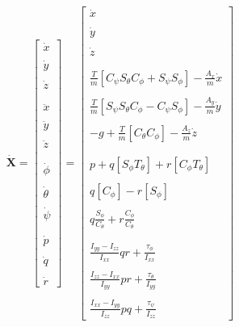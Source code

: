 \documentclass[letterpaper, 10 pt, conference]{ieeeconf}  %
\begin{document}
 $$
 \dot{\boldsymbol{X}} =
 \left[
 \begin{array}{c}
 \dot{x} \\
 {}\\
 \dot{y} \\
 {}\\
 \dot{z} \\
 {}\\
 {}\\
 \ddot{x} \\
 {}\\
 \ddot{y} \\
 {}\\
 \ddot{z} \\
 {}\\
 {}\\
 \dot{\phi} \\
 {}\\
 \dot{\theta} \\
 {}\\
 \dot{\psi} \\
 {}\\
 {}\\
 \dot{p} \\
 {}\\
 \dot{q} \\
 {}\\
 \dot{r}
 \end{array}
 \right]
 =
 \left[
 \begin{array}{l}
 \dot{x} \\
 {}\\
 \dot{y} \\
 {}\\
 \dot{z} \\
 {}\\
 {}\\
 \frac{T}{m}[C_{\psi} S_{\theta} C_{\phi} + S_{\psi} S_{\phi}] - \frac{A_x}{m} \dot{x} \\
 {}\\
 \frac{T}{m}[ S_{\psi} S_{\theta} C_{\phi} - C_{\psi} S_{\phi}] - \frac{A_y}{m} \dot{y} \\
 {}\\
 -g+\frac{T}{m}[C_{\theta} C_{\phi}] - \frac{A_z}{m} \dot{z} \\
 {}\\
 {}\\
 p+ q[S_{\phi} T_{\theta}] + r[C_{\phi} T_{\theta}] \\
 {}\\
 q[C_{\phi}]-r[S_{\phi}] \\
 {}\\
 q \frac{S_{\phi}}{C_{\theta}} + r \frac{C_{\phi}}{C_{\theta}} \\
 {}\\
 {}\\
 \frac{I_{yy}-I_{zz}}{I_{xx}} q r  +\frac{\tau_{\phi}}{I_{xx}} \\
 {}\\
 \frac{I_{zz}-I_{xx}}{I_{yy}} p r +\frac{\tau_{\theta}}{I_{yy}} \\
 {}\\
 \frac{I_{xx}-I_{yy}}{I_{zz}} p q +\frac{\tau_{\psi}}{I_{zz}}
 \end{array}
 \right]
 $$
\end{document}
